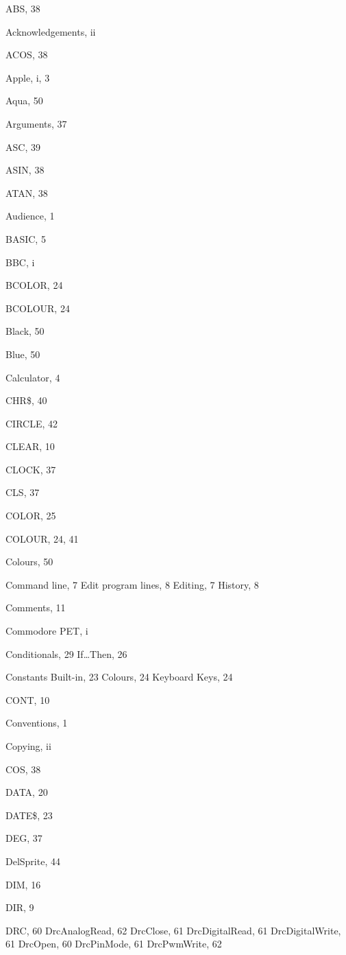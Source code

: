 \begin{theindex}

  \item ABS, 38
  \item Acknowledgements, ii
  \item ACOS, 38
  \item Apple, i, 3
  \item Aqua, 50
  \item Arguments, 37
  \item ASC, 39
  \item ASIN, 38
  \item ATAN, 38
  \item Audience, 1

  \indexspace

  \item BASIC, 5
  \item BBC, i
  \item BCOLOR, 24
  \item BCOLOUR, 24
  \item Black, 50
  \item Blue, 50

  \indexspace

  \item Calculator, 4
  \item CHR\$, 40
  \item CIRCLE, 42
  \item CLEAR, 10
  \item CLOCK, 37
  \item CLS, 37
  \item COLOR, 25
  \item COLOUR, 24, 41
  \item Colours, 50
  \item Command line, 7
    \subitem Edit program lines, 8
    \subitem Editing, 7
    \subitem History, 8
  \item Comments, 11
  \item Commodore PET, i
  \item Conditionals, 29
    \subitem If\dots Then, 26
  \item Constants
    \subitem Built-in, 23
    \subitem Colours, 24
    \subitem Keyboard Keys, 24
  \item CONT, 10
  \item Conventions, 1
  \item Copying, ii
  \item COS, 38

  \indexspace

  \item DATA, 20
  \item DATE\$, 23
  \item DEG, 37
  \item DelSprite, 44
  \item DIM, 16
  \item DIR, 9
  \item DRC, 60
    \subitem DrcAnalogRead, 62
    \subitem DrcClose, 61
    \subitem DrcDigitalRead, 61
    \subitem DrcDigitalWrite, 61
    \subitem DrcOpen, 60
    \subitem DrcPinMode, 61
    \subitem DrcPwmWrite, 62


\end{theindex}

